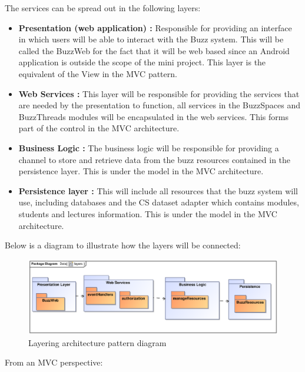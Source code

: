 \documentclass[a4paper]{article}
\begin{document}
The services can be spread out in the following layers:
\begin{itemize}
			\item \textbf{Presentation (web application) :} Responsible for providing an interface in which users will be able to interact with the Buzz system. This will be called the BuzzWeb for the fact that it will be web based since an Android application is outside the scope of the mini project. This layer is the equivalent of the View in the MVC pattern.
			\item \textbf{Web Services :} This layer will be responsible for providing the services that are needed by the presentation to function, all services in the BuzzSpaces and BuzzThreads modules will be encapsulated in the web services. This forms part of the control in the MVC architecture.
			\item \textbf{Business Logic :} The business logic will be responsible for providing a channel to store and retrieve data from the buzz resources contained in the persistence layer. This is under the model in the MVC architecture.
			\item \textbf{Persistence layer :} This will include all resources that the buzz system will use, including databases and the CS dataset adapter which contains modules, students and lectures information. This is under the model in the MVC architecture.  \\[1em]
\end{itemize}

Below is a diagram to illustrate how the layers will be connected:

\begin{figure}[H]
\includegraphics[width=\textwidth]{layers.eps}
\caption{Layering architecture pattern diagram \label{overflow}}
\end{figure}


From an MVC perspective:
\end{document}

